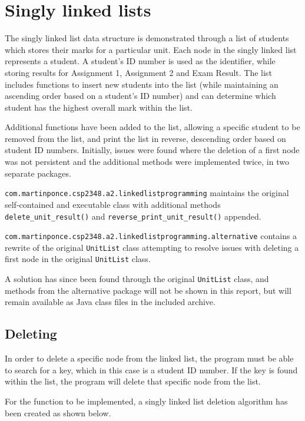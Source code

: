 \newpage
\section{Singly linked lists}

The singly linked list data structure is demonstrated through a list of students which stores their marks for a particular unit. Each node in the singly linked list represents a student. A student's ID number is used as the identifier, while storing results for Assignment 1, Assignment 2 and Exam Result. The list includes functions to insert new students into the list (while maintaining an ascending order based on a student's ID number) and can determine which student has the highest overall mark within the list.

Additional functions have been added to the list, allowing a specific student to be removed from the list, and print the list in reverse, descending order based on student ID numbers. Initially, issues were found where the deletion of a first node was not persistent and the additional methods were implemented twice, in two separate packages.

\texttt{com.martinponce.csp2348.a2.linkedlistprogramming} maintains the original self-contained and executable class with additional methods \texttt{delete_unit_result()} and \texttt{reverse_print_unit_result()} appended.

\texttt{com.martinponce.csp2348.a2.linkedlistprogramming.alternative} contains a rewrite of the original \texttt{UnitList} class attempting to resolve issues with deleting a first node in the original \texttt{UnitList} class. 

A solution has since been found through the original \texttt{UnitList} class, and methods from the alternative package will not be shown in this report, but will remain available as Java class files in the included archive.

\newpage
\subsection{Deleting}

In order to delete a specific node from the linked list, the program must be able to search for a key, which in this case is a student ID number. If the key is found within the list, the program will delete that specific node from the list.

For the function to be implemented, a singly linked list deletion algorithm has been created as shown below.


